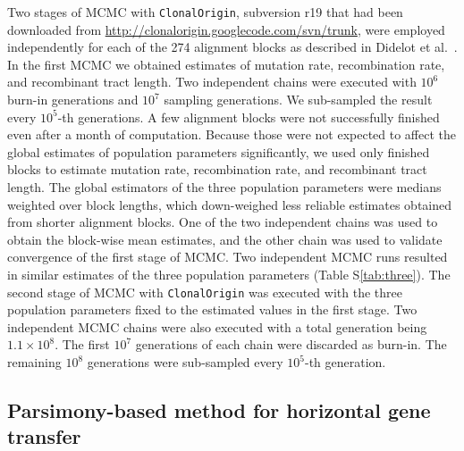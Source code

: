 \documentclass[10pt]{article}
\let\citet\cite
\begin{document}
Two stages of MCMC with \texttt{ClonalOrigin}, subversion r19 that had been
downloaded from \url{http://clonalorigin.googlecode.com/svn/trunk}, were
employed independently for each of the 274 alignment blocks as described in
Didelot et al.\ \citet{Didelot2010}.   In the first MCMC we obtained estimates of mutation rate,
recombination rate, and recombinant tract length.  Two independent chains were
executed with $10^6$ burn-in generations and $10^7$ sampling generations. We
sub-sampled the result every $10^5$-th generations.  A few alignment blocks were
not successfully finished even after a month of computation.  Because those were
not expected to affect the global estimates of population parameters
significantly, we used only finished blocks to estimate mutation rate,
recombination rate, and recombinant tract length.  The global estimators of the
three population parameters were medians weighted over block lengths, which
down-weighed less reliable estimates obtained from shorter alignment blocks.
One of the two independent chains was used to obtain the block-wise mean
estimates, and the other chain was used to validate convergence of the first
stage of MCMC.  Two independent MCMC runs resulted in similar estimates of the
three population parameters (Table S\ref{tab:three}).  The second stage of MCMC
with \texttt{ClonalOrigin} was executed with the three population parameters
fixed to the estimated values in the first stage.  Two independent MCMC chains
were also executed with a total generation being $1.1\times10^8$. The first
$10^7$ generations of each chain were discarded as burn-in. The remaining $10^8$
generations were sub-sampled every $10^5$-th generation.  

\subsection*{Parsimony-based method for horizontal gene transfer}
\end{document}
